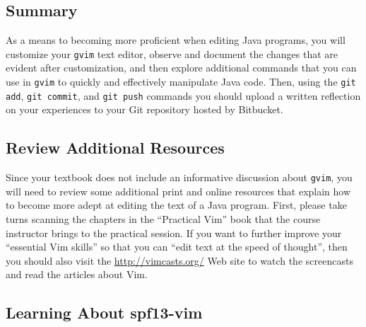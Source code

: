 



\vspace*{-.2in}
\subsection*{Summary}
\vspace*{-.05in}

As a means to becoming more proficient when editing Java programs, you will customize your {\tt gvim} text editor,
observe and document the changes that are evident after customization, and then explore additional commands that you can
use in {\tt gvim} to quickly and effectively manipulate Java code.  Then, using the {\tt git add}, {\tt git commit}, and
{\tt git push} commands you should upload a written reflection on your experiences to your Git repository hosted by
Bitbucket.  

\vspace*{-.15in}
\subsection*{Review Additional Resources}
\vspace*{-.05in}

Since your textbook does not include an informative discussion about {\tt gvim}, you will need to review some additional print
and online resources that explain how to become more adept at editing the text of a Java program.  First, please take
turns scanning the chapters in the ``Practical Vim'' book that the course instructor brings to the practical session. If
you want to further improve your ``essential Vim skills'' so that you can ``edit text at the speed of thought'', then
you should also visit the \url{http://vimcasts.org/} Web site to watch the screencasts and read the articles about Vim.

\vspace*{-.15in}
\subsection*{Learning About spf13-vim} 
\vspace*{-.05in}

